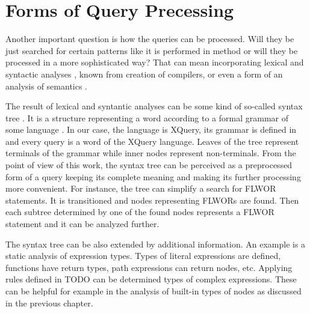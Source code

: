 \section{Forms of Query Precessing}
Another important question is how the queries can be processed. Will they be just searched for certain patterns like it is performed in method \cite{Necasky:2009:DXK:1529282.1529414} or will they be processed in a more sophisticated way? That can mean incorporating lexical and syntactic analyses , known from creation of compilers, or even a form of an analysis of semantics .


The result of lexical and syntantic analyses can be some kind of so-called syntax tree . It is a structure representing a word according to a formal grammar of some language . In our case, the language is XQuery, its grammar is defined in  and every query is a word of the XQuery language. Leaves of the tree represent terminals of the grammar while inner nodes represent non-terminals.  From the point of view of this work, the syntax tree can be perceived as a preprocessed form of a query keeping its complete meaning and making its further processing more convenient. For instance, the tree can simplify a search for FLWOR statements. It is transitioned and nodes representing FLWORs are found. Then each subtree determined by one of the found nodes represents a FLWOR statement and it can be analyzed further.

The syntax tree can be also extended by additional information. An example is a static analysis of expression types. Types of literal expressions are defined, functions have return types, path expressions can return nodes, etc. Applying  rules defined in TODO  can be determined types of complex expressions. These can be helpful for example in the analysis of built-in types of nodes as discussed in the previous chapter. 

